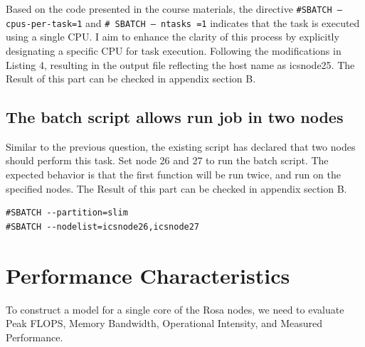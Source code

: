 \documentclass[unicode,11pt,a4paper,oneside,numbers=endperiod,openany]{scrartcl}
\begin{document}
Based on the code presented in the course materials, the directive \texttt{\#SBATCH --cpus-per-task=1} and \texttt{\# SBATCH -- ntasks =1} indicates that the task is executed using a single CPU. I aim to enhance the clarity of this process by explicitly designating a specific CPU for task execution. Following the modifications in Listing 4, resulting in the output file reflecting the host name as icsnode25. The Result of this part can be checked in appendix section B.

\subsection{The batch script allows run job in two nodes}
Similar to the previous question, the existing script has declared that two nodes should perform this task. Set node 26 and 27 to run the batch script. The expected behavior is that the first function will be run twice, and run on the specified nodes. The Result of this part can be checked in appendix section B.
\begin{lstlisting}[style=mystyle, language=MyBatch, caption={Specify two nodes to run}]
#SBATCH --partition=slim 
#SBATCH --nodelist=icsnode26,icsnode27
\end{lstlisting}


\section{Performance Characteristics }
To construct a model for a single core of the Rosa nodes, we need to evaluate Peak FLOPS, Memory Bandwidth, Operational Intensity, and Measured Performance.
\end{document}
